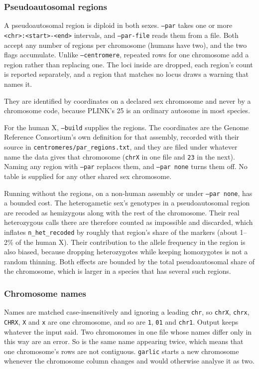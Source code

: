 \documentclass[12pt]{article}%
\begin{document}
\subsubsection{Pseudoautosomal regions}

A pseudoautosomal region is diploid in both sexes.  {\tt --par} takes one or
more {\tt <chr>:<start>-<end>} intervals, and {\tt --par-file} reads them from
a file.  Both accept any number of regions per chromosome (humans have two),
and the two flags accumulate.  Unlike {\tt --centromere}, repeated rows for one
chromosome add a region rather than replacing one.  The loci inside are
dropped, each region's count is reported separately, and a region that matches
no locus draws a warning that names it.

They are identified by coordinates on a declared sex chromosome and never by a
chromosome code, because PLINK's 25 is an ordinary autosome in most species.

For the human X, {\tt --build} supplies the regions.  The coordinates are the
Genome Reference Consortium's own definition for that assembly, recorded with
their source in {\tt centromeres/par\_regions.txt}, and they are filed under
whatever name the data gives that chromosome ({\tt chrX} in one file and
{\tt 23} in the next).  Naming any region with {\tt --par} replaces them, and
{\tt --par none} turns them off.  No table is supplied for any other shared sex
chromosome.

Running without the regions, on a non-human assembly or under {\tt --par none},
has a bounded cost.  The heterogametic sex's genotypes in a pseudoautosomal
region are recoded as hemizygous along with the rest of the chromosome.  Their
real heterozygous calls there are therefore counted as impossible and
discarded, which inflates {\tt n\_het\_recoded} by roughly that region's share
of the markers (about 1--2\% of the human X).  Their contribution to the allele
frequency in the region is also biased, because dropping heterozygotes while
keeping homozygotes is not a random thinning.  Both effects are bounded by the
total pseudoautosomal share of the chromosome, which is larger in a species
that has several such regions.

\subsubsection{Chromosome names}

Names are matched case-insensitively and ignoring a leading {\tt chr}, so
{\tt chrX}, {\tt chrx}, {\tt CHRX}, {\tt X} and {\tt x} are one chromosome, and
so are {\tt 1}, {\tt 01} and {\tt chr1}.  Output keeps whatever the input said.
Two chromosomes in one file whose names differ only in this way are an error.
So is the same name appearing twice, which means that one chromosome's rows are
not contiguous.  {\tt garlic} starts a new chromosome whenever the chromosome
column changes and would otherwise analyse it as two.
\end{document}
